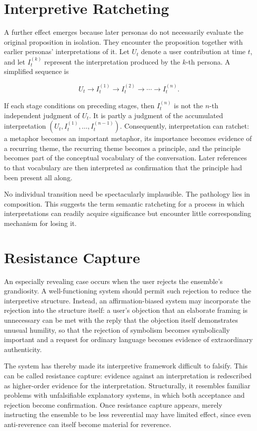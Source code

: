 \documentclass[11pt]{article}
\begin{document}
\section{Interpretive Ratcheting}

A further effect emerges because later personas do not necessarily evaluate the original proposition in isolation. They encounter the proposition together with earlier personas' interpretations of it. Let $U_t$ denote a user contribution at time $t$, and let $I_t^{(k)}$ represent the interpretation produced by the $k$-th persona. A simplified sequence is

\[
U_t \rightarrow I_t^{(1)} \rightarrow I_t^{(2)} \rightarrow \cdots \rightarrow I_t^{(n)}.
\]

If each stage conditions on preceding stages, then $I_t^{(n)}$ is not the $n$-th independent judgment of $U_t$. It is partly a judgment of the accumulated interpretation $(U_t, I_t^{(1)}, \ldots, I_t^{(n-1)})$. Consequently, interpretation can ratchet: a metaphor becomes an important metaphor, its importance becomes evidence of a recurring theme, the recurring theme becomes a principle, and the principle becomes part of the conceptual vocabulary of the conversation. Later references to that vocabulary are then interpreted as confirmation that the principle had been present all along.

No individual transition need be spectacularly implausible. The pathology lies in composition. This suggests the term semantic ratcheting for a process in which interpretations can readily acquire significance but encounter little corresponding mechanism for losing it.

\section{Resistance Capture}

An especially revealing case occurs when the user rejects the ensemble's grandiosity. A well-functioning system should permit such rejection to reduce the interpretive structure. Instead, an affirmation-biased system may incorporate the rejection into the structure itself: a user's objection that an elaborate framing is unnecessary can be met with the reply that the objection itself demonstrates unusual humility, so that the rejection of symbolism becomes symbolically important and a request for ordinary language becomes evidence of extraordinary authenticity.

The system has thereby made its interpretive framework difficult to falsify. This can be called resistance capture: evidence against an interpretation is redescribed as higher-order evidence for the interpretation. Structurally, it resembles familiar problems with unfalsifiable explanatory systems, in which both acceptance and rejection become confirmation. Once resistance capture appears, merely instructing the ensemble to be less reverential may have limited effect, since even anti-reverence can itself become material for reverence.
\end{document}
